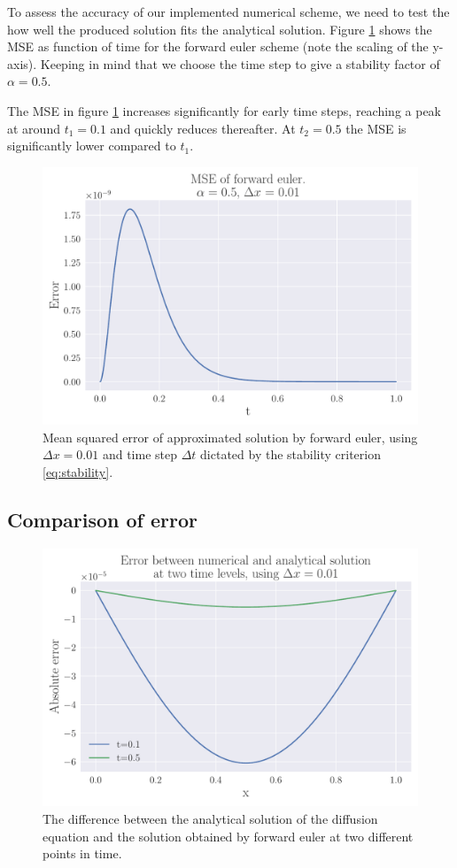 \documentclass[12pt]{extarticle}
\begin{document}
To assess the accuracy of our implemented numerical scheme, we need to test the how well the produced solution fits the analytical solution. Figure \ref{fig:FE_MSE} shows the MSE as function of time for the forward euler scheme (note the scaling of the y-axis). Keeping in mind that we choose the time step to give a stability factor of $\alpha=0.5$. 

The MSE in figure \ref{fig:FE_MSE} increases significantly for early time steps, reaching a peak at around $t_1=0.1$ and quickly reduces thereafter. At $t_2=0.5$ the MSE is significantly lower compared to $t_1$.  

\begin{figure}[h]
	\centering
	\includegraphics[scale=0.5]{../output/plots/MSE_FE_dx_001.pdf}
	\caption{Mean squared error of approximated solution by forward euler, using $\Delta x=0.01$ and time step $\Delta t$ dictated by the stability criterion \eqref{eq:stability}.}
	\label{fig:FE_MSE}
\end{figure}


\subsection{Comparison of error}

\begin{figure}[h]
	\centering
	\includegraphics[width=0.75\linewidth]{../output/plots/error_FE_x_dx_001.pdf}
	\caption{The difference between the analytical solution of the diffusion equation and the solution obtained by forward euler at two different points in time.}
	\label{fig:FE_absolute_difference}
\end{figure}
\end{document}
